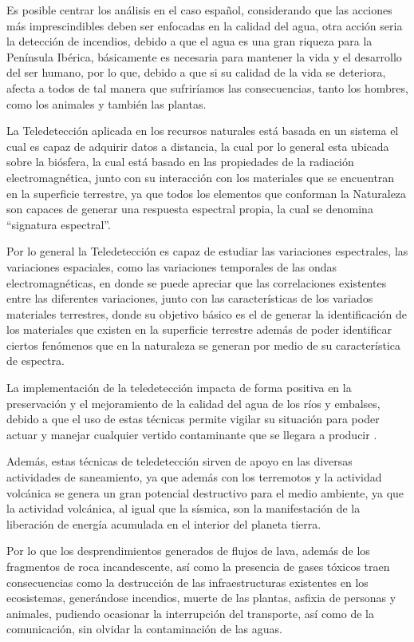 Es posible centrar los análisis en el caso español, considerando que las acciones más imprescindibles deben ser enfocadas en la calidad del agua, otra acción seria la detección de incendios, debido a que el agua es una gran riqueza para la Península Ibérica, básicamente es necesaria para mantener la vida y el desarrollo del ser humano, por lo que, debido a que si su calidad de la vida se deteriora, afecta a todos de tal manera que sufriríamos las consecuencias, tanto los hombres, como los animales y también las plantas. 

La Teledetección aplicada en los recursos naturales está basada en un sistema el cual es capaz de adquirir datos a distancia, la cual por lo general esta ubicada sobre la biósfera, la cual está basado en las propiedades de la radiación electromagnética, junto con su interacción con los materiales que se encuentran en la superficie terrestre, ya que todos los elementos que conforman la Naturaleza son capaces de generar una respuesta espectral propia, la cual se denomina “signatura espectral”.

Por lo general la Teledetección es capaz de estudiar las variaciones espectrales, las variaciones espaciales, como las variaciones temporales de las ondas electromagnéticas, en donde se puede apreciar que las correlaciones existentes entre las diferentes variaciones, junto con las características de los variados materiales terrestres, donde su objetivo básico es el de generar la identificación de los materiales que existen en la superficie terrestre además de poder identificar ciertos fenómenos que en la naturaleza se generan por medio de su característica de espectra.

La implementación de la teledetección impacta de forma positiva en la preservación y el mejoramiento de la calidad del agua de los ríos y embalses, debido a que el uso de estas técnicas permite vigilar su situación para poder actuar y manejar cualquier vertido contaminante que se llegara a producir \cite{Rosello2009}.

Además, estas técnicas de teledetección sirven de apoyo en las diversas actividades de saneamiento, ya que además con los terremotos y la actividad volcánica se genera un gran potencial destructivo para el medio ambiente, ya que la actividad volcánica, al igual que la sísmica, son la manifestación de la liberación de energía acumulada en el interior del planeta tierra.

Por lo que los desprendimientos generados de flujos de lava, además de los fragmentos de roca incandescente, así como la presencia de gases tóxicos traen consecuencias como la destrucción de las infraestructuras existentes en los ecosistemas, generándose incendios, muerte de las plantas, asfixia de personas y animales, pudiendo ocasionar la interrupción del transporte, así como de la comunicación, sin olvidar la contaminación de las aguas.

